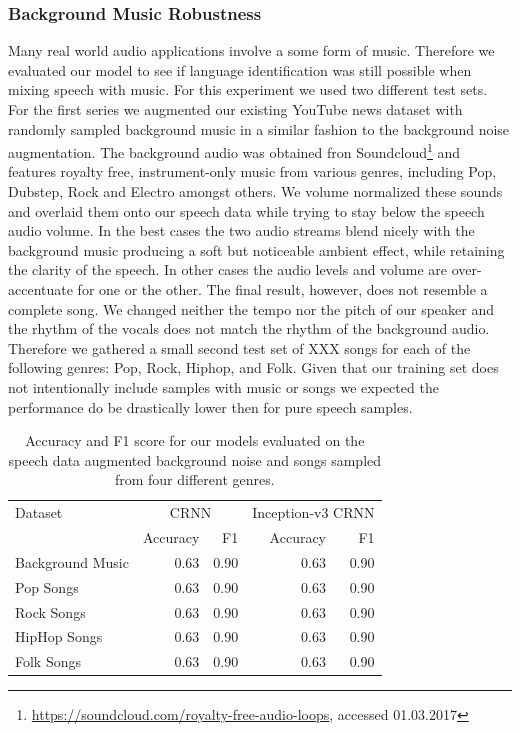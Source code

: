 \subsubsection{Background Music Robustness} 
\label{sec:music_robustness}
Many real world audio applications involve a some form of music. Therefore we evaluated our model to see if language identification was still possible when mixing speech with music. For this experiment we used two different test sets. For the first series we augmented our existing YouTube news dataset with randomly sampled background music in a similar fashion to the background noise augmentation. The background audio was obtained fron Soundcloud\footnote{\url{https://soundcloud.com/royalty-free-audio-loops}, accessed 01.03.2017} and features royalty free, instrument-only music from various genres, including Pop, Dubstep, Rock and Electro amongst others. 
We volume normalized these sounds and overlaid them onto our speech data while trying to stay below the speech audio volume. In the best cases the two audio streams blend nicely with the background music producing a soft but noticeable ambient effect, while retaining the clarity of the speech. In other cases the audio levels and volume are over-accentuate for one or the other. The final result, however, does not resemble a complete song. We changed neither the tempo nor the pitch of our speaker and the rhythm of the vocals does not match the rhythm of the background audio. Therefore we gathered a small second test set of XXX  songs for each of the following genres: Pop, Rock, Hiphop, and Folk. 
Given that our training set does not intentionally include samples with music or songs we expected the performance do be drastically lower then for pure speech samples.

	\begin{table}[]
	\centering
	\begin{tabularx}{\textwidth}{lrrrr}
	\toprule
Dataset & \multicolumn{2}{c}{CRNN} & \multicolumn{2}{c}{Inception-v3 CRNN} \\   
                  & Accuracy  & F1    & Accuracy   & F1   \\ \midrule
Background Music  & 0.63      & 0.90  & 0.63  & 0.90 \\
Pop Songs         & 0.63      & 0.90  & 0.63  & 0.90 \\
Rock Songs        & 0.63      & 0.90  & 0.63  & 0.90 \\
HipHop Songs      & 0.63      & 0.90  & 0.63  & 0.90 \\
Folk Songs        & 0.63      & 0.90  & 0.63  & 0.90 \\

 	\bottomrule
	\end{tabularx}
	\caption{Accuracy and F1 score for our models evaluated on the speech data augmented background noise and songs sampled from four different genres.}
	\label{tab:audio_duration}
	\end{table}

